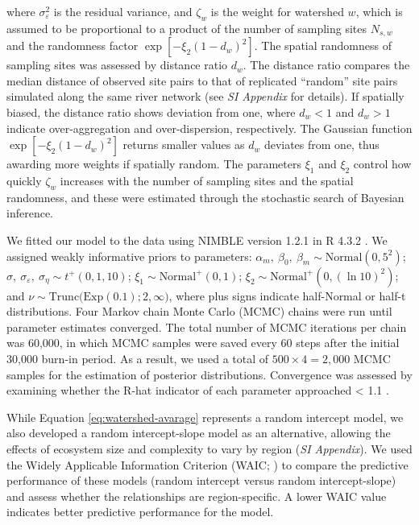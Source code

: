 \documentclass[11pt, class=article, crop=false]{standalone}
\begin{document}
where $\sigma_{\varepsilon}^2$ is the residual variance, and $\zeta_w$ is the weight for watershed $w$, which is assumed to be proportional to a product of the number of sampling sites $N_{s,w}$ and the randomness factor $\exp[-\xi_2 (1 - d_{w})^2]$.
The spatial randomness of sampling sites was assessed by distance ratio $d_{w}$.
The distance ratio compares the median distance of observed site pairs to that of replicated ``random'' site pairs simulated along the same river network (see \textit{SI Appendix} for details).
If spatially biased, the distance ratio shows deviation from one, where $d_{w} < 1$ and $d_{w} > 1$ indicate over-aggregation and over-dispersion, respectively.
The Gaussian function $\exp[-\xi_2 (1 - d_{w})^2]$ returns smaller values as $d_{w}$ deviates from one, thus awarding more weights if spatially random.
The parameters $\xi_1$ and $\xi_2$ control how quickly $\zeta_w$ increases with the number of sampling sites and the spatial randomness, and these were estimated through the stochastic search of Bayesian inference.

We fitted our model to the data using NIMBLE version 1.2.1 \citep{nimble, pkg_nimble} in R 4.3.2 \citep{r_program}.
We assigned weakly informative priors to parameters: $\alpha_m,~\beta_0,~\beta_m \sim \mbox{Normal}(0, 5^2)$; $\sigma,~\sigma_{\varepsilon},~\sigma_{\eta} \sim t^+(0, 1, 10)$; $\xi_1 \sim \mbox{Normal}^+(0, 1)$; $\xi_2 \sim \mbox{Normal}^+(0, (\ln 10)^2)$; and $\nu \sim \mbox{Trunc(Exp}(0.1); 2, \infty)$, where plus signs indicate half-Normal or half-t distributions. 
Four Markov chain Monte Carlo (MCMC) chains were run until parameter estimates
converged.
The total number of MCMC iterations per chain was 60,000, in which MCMC samples were saved every 60 steps after the initial 30,000 burn-in period.
As a result, we used a total of $500 \times 4 = 2,000$ MCMC samples for the estimation of posterior distributions.
Convergence was assessed by examining whether the R-hat indicator of each parameter approached < 1.1 \citep{gelman2013bayesian}.

While Equation \ref{eq:watershed-avarage} represents a random intercept model, we also developed a random intercept-slope model as an alternative, allowing the effects of ecosystem size and complexity to vary by region (\textit{SI Appendix}).
We used the Widely Applicable Information Criterion (WAIC; \citep{watanabe_asymptotic_2010}) to compare the predictive performance of these models (random intercept versus random intercept-slope) and assess whether the relationships are region-specific.
A lower WAIC value indicates better predictive performance for the model.
\end{document}
